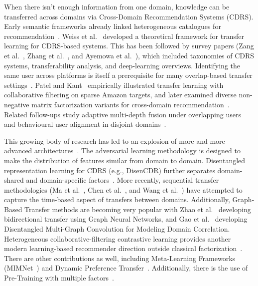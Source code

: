 \documentclass[pdflatex,sn-mathphys-num]{sn-jnl}%
\theoremstyle{thmstyleone}%
\theoremstyle{thmstyletwo}%
\theoremstyle{thmstylethree}%
\begin{document}
When there isn't enough information from one domain, knowledge can be transferred across domains via Cross-Domain Recommendation Systems (CDRS). Early semantic frameworks already linked heterogeneous catalogues for recommendation~\cite{fernandez2012generic}. Weiss et al.~\cite{weiss2016survey} developed a theoretical framework for transfer learning for CDRS-based systems. This has been followed by survey papers (Zang et al.~\cite{zang2022survey}, Zhang et al.~\cite{zhang2021transferability}, and Ayemowa et al.~\cite{ayemowa2024systematic}), which included taxonomies of CDRS systems, transferability analysis, and deep-learning overviews. Identifying the same user across platforms is itself a prerequisite for many overlap-based transfer settings~\cite{shu2018crossplatform}. Patel and Kant~\cite{patel2025enhanced} empirically illustrated transfer learning with collaborative filtering on sparse Amazon targets, and later examined diverse non-negative matrix factorization variants for cross-domain recommendation~\cite{patel2025enhancedNMF}. Related follow-ups study adaptive multi-depth fusion under overlapping users~\cite{patel2026adaptive} and behavioural user alignment in disjoint domains~\cite{patel2025optimal}.

This growing body of research has led to an explosion of more and more advanced architectures~\cite{li2022adversarial, su2024cross, kong2024dadin, cao2022disencdr}. The adversarial learning methodology is designed to make the distribution of features similar from domain to domain. Disentangled representation learning for CDRS (e.g., DisenCDR) further separates domain-shared and domain-specific factors~\cite{cao2022disencdr}. More recently, sequential transfer methodologies (Ma et al.~\cite{ma2024triple}, Chen et al.~\cite{chen2025recurrent}, and Wang et al.~\cite{wang2025hierarchical}) have attempted to capture the time-based aspect of transfers between domains. Additionally, Graph-Based Transfer methods are becoming very popular with Zhao et al.~\cite{zhao2025cross} developing bidirectional transfer using Graph Neural Networks, and Gao et al.~\cite{gao2025disentangled} developing Disentangled Multi-Graph Convolution for Modeling Domain Correlation. Heterogeneous collaborative-filtering contrastive learning provides another modern learning-based recommender direction outside classical factorization~\cite{meng2025heterogeneous}. There are other contributions as well, including Meta-Learning Frameworks (MIMNet~\cite{zhu2025mimnet}) and Dynamic Preference Transfer~\cite{duan2025dynamic}. Additionally, there is the use of Pre-Training with multiple factors~\cite{wang2025mf}.
\end{document}
